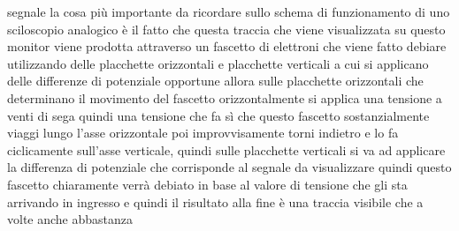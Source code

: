 segnale la cosa più importante da ricordare sullo schema di funzionamento di uno sciloscopio analogico è il fatto che questa traccia che viene visualizzata su questo monitor viene prodotta attraverso un fascetto di elettroni che viene fatto debiare utilizzando delle placchette orizzontali e placchette verticali a cui si applicano delle differenze di potenziale opportune allora sulle placchette orizzontali che determinano il movimento del fascetto orizzontalmente si applica una tensione a venti di sega quindi una tensione che fa sì che questo fascetto sostanzialmente viaggi lungo l'asse orizzontale poi improvvisamente torni indietro e lo fa ciclicamente sull'asse verticale, quindi sulle placchette verticali si va ad applicare la differenza di potenziale che corrisponde al segnale da visualizzare quindi questo fascetto chiaramente verrà debiato in base al valore di tensione che gli sta arrivando in ingresso e quindi il risultato alla fine è una traccia visibile che a volte anche abbastanza 

